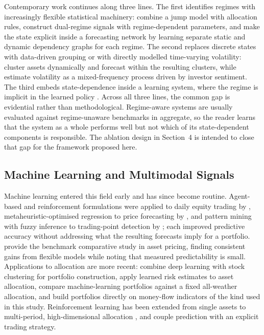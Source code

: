 Contemporary work continues along three lines. The first identifies regimes with
increasingly flexible statistical machinery: \citet{li25} combine a jump model with
allocation rules, \citet{luo26} construct dual-regime signals with regime-dependent
parameters, and \citet{bukhari26} make the state explicit inside a forecasting network by
learning separate static and dynamic dependency graphs for each regime. The second
replaces discrete states with data-driven grouping or with directly modelled
time-varying volatility: \citet{kehinde26} cluster assets dynamically and forecast within
the resulting clusters, while \citet{naidoo25} estimate volatility as a mixed-frequency
process driven by investor sentiment. The third embeds state-dependence inside a
learning system, where the regime is implicit in the learned policy \citep{jiang25}.
Across all three lines, the common gap is evidential rather than methodological. Regime-aware systems are usually
evaluated against regime-unaware benchmarks in aggregate, so the reader learns that the
system as a whole performs well but not which of its state-dependent components is
responsible. The ablation design in Section~4 is intended to close that gap for the
framework proposed here.

\subsection{Machine Learning and Multimodal Signals}

Machine learning entered this field early and has since become routine. Agent-based
and reinforcement formulations were applied to daily equity trading by \citet{lee07},
metaheuristic-optimised regression to price forecasting by \citet{chou18}, and pattern
mining with fuzzy inference to trading-point detection by \citet{huang20}; each
improved predictive accuracy without addressing what the resulting forecasts imply for a
portfolio. \citet{gu20} provide the benchmark comparative study in asset pricing,
finding consistent gains from flexible models while noting that measured predictability
is small. Applications to allocation
are more recent: \citet{ashrafzadeh25} combine deep learning with stock clustering for
portfolio construction, \citet{agal25} apply learned risk estimates to asset
allocation, \citet{ha26} compare machine-learning portfolios against a fixed
all-weather allocation, and \citet{singsiri26} build portfolios directly on money-flow
indicators of the kind used in this study. Reinforcement learning has been extended from single assets to
multi-period, high-dimensional allocation \citep{jiang25, saijai26}, and
\citet{wang26} couple prediction with an explicit trading strategy.

